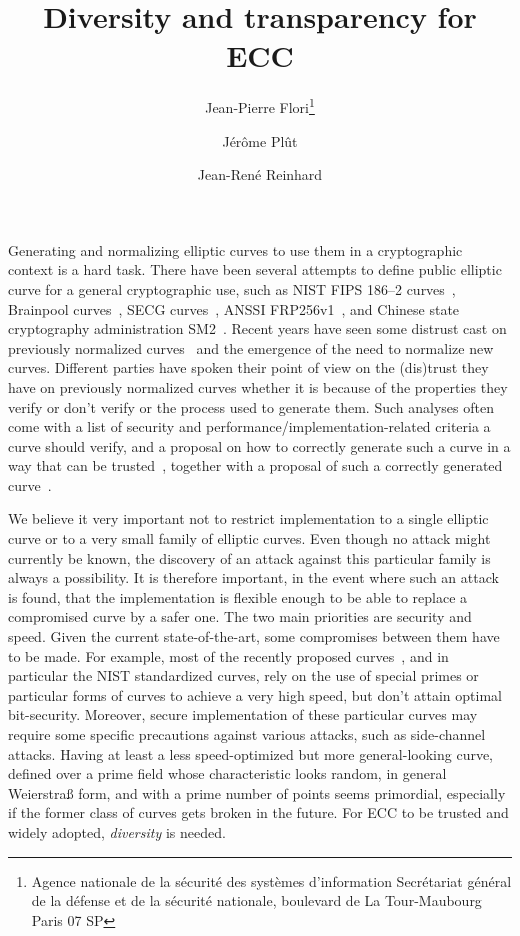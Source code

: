 \documentclass[twocolumn,letterpaper,10pt]{article}
\title{Diversity and transparency for ECC}
\author{Jean-Pierre Flori\thanks{Agence nationale de la sécurité des systèmes d'information\newline%
Secrétariat général de la défense et de la sécurité nationale\newline%
51, boulevard de La Tour-Maubourg\newline%
75700 Paris 07 SP}%
\and Jérôme Plût\footnotemark[1] \and Jean-René Reinhard\footnotemark[1]}
\date{}
\def\gitkw$#1:#2${{\small \textbf{#1:} \texttt{#2}}}
\begin{document}
\sloppy
\maketitle
\thispagestyle{fancy}\cfoot{}
\lhead{\gitkw $Author:$}
\chead{\gitkw $Id:$}
\rhead{\gitkw $Date:$}
Generating and normalizing elliptic curves to use them in a cryptographic
context is a hard task.
There have been several attempts to define public elliptic curve
for a general cryptographic use,
such as NIST FIPS 186--2 curves~\cite{nist2000fips186-2},
Brainpool curves~\cite{rfc5639},
SECG curves~\cite{certicom2010sec2},
ANSSI FRP256v1~\cite{jorf2011ce},
and Chinese state cryptography administration SM2~\cite{oscca2010sm2}.
Recent years have seen some distrust cast on previously normalized
curves~\cite{rfc5639,nist2000fips186-2,jorf2011ce,oscca2010sm2}
and the emergence of the need to normalize new curves.
Different parties have spoken their point of view on the (dis)trust they have
on previously normalized curves whether it is because of
the properties they verify or don't verify
or the process used to generate them.
Such analyses often come with
a list of security and performance/implementation-related criteria
a curve should verify,
and a proposal on how to correctly generate such a curve in a way that can be
trusted~\cite{safecurves,msr2014bcln,brainpool2005,eprint2014brainpool,eprint2013abgr},
together with a proposal of such a correctly generated
curve~\cite{pkc2006bernstein,msr2014bcln,eprint2013abgr}.

\medskip
We believe it very important not to restrict implementation
to a single elliptic curve or to a very small family of elliptic curves.
Even though no attack might currently be known,
the discovery of an attack against this particular family
is always a possibility.
It is therefore important, in the event where such an attack is found,
that the implementation is flexible enough to be able to
replace a compromised curve by a safer one.
The two main priorities are security and speed.
Given the current state-of-the-art,
some compromises between them have to be made.
For example, most of the recently proposed
curves~\cite{pkc2006bernstein,msr2014bcln,eprint2013abgr,oscca2010sm2},
and in particular the NIST standardized curves,
rely on the use of special primes or particular forms of curves to
achieve a very high speed,
but don't attain optimal bit-security.
Moreover, secure implementation of these particular curves
may require some specific precautions against various attacks,
such as side-channel attacks.
Having at least a less speed-optimized but more general-looking curve,
defined over a prime field whose characteristic looks random,
in general Weierstraß form, and with a prime number of points
seems primordial,
especially if the former class of curves gets broken in the future.
For ECC to be trusted and widely adopted, \emph{diversity} is needed.
\end{document}
